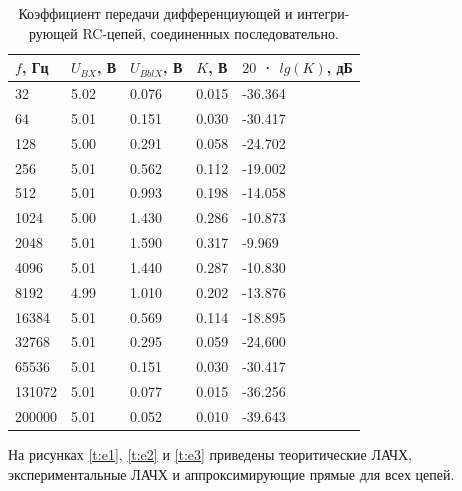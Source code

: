 \begin{table}[H]
	\begin{center}
	\caption{Коэффициент передачи дифференциующей и интегри-
рующей RC-цепей, соединенных последовательно.}
	\def\arraystretch{1.5}
		\begin{tabularx}{\textwidth}{|X|X|X|X|X|}
			\hline
			$f$, Гц & $U_{BX}$, В & $U_{BblX}$, В & $K$, В & $20$ · $lg(K)$, дБ\\\hline
			32 & 5.02 & 0.076 & 0.015 & -36.364\\\hline
			64 & 5.01 & 0.151 & 0.030 & -30.417\\\hline
			128 & 5.00 & 0.291 & 0.058 & -24.702\\\hline
			256 & 5.01 & 0.562 & 0.112 & -19.002\\\hline
			512 & 5.01 & 0.993 & 0.198 & -14.058\\\hline
			1024 & 5.00 & 1.430 & 0.286 & -10.873\\\hline
			2048 & 5.01 & 1.590 & 0.317 & -9.969\\\hline
			4096 & 5.01 & 1.440 & 0.287 & -10.830\\\hline
			8192 & 4.99 & 1.010 & 0.202 & -13.876\\\hline
			16384 & 5.01 & 0.569 & 0.114 & -18.895\\\hline
			32768 & 5.01 & 0.295 & 0.059 & -24.600\\\hline
			65536 & 5.01 & 0.151 & 0.030 & -30.417\\\hline
			131072 & 5.01 & 0.077 & 0.015 & -36.256\\\hline
			200000 & 5.01 & 0.052 & 0.010 & -39.643\\\hline		
		\end{tabularx}
		\label{tabular:3}
	\end{center}
\end{table}

На рисунках \ref{t:e1}, \ref{t:e2} и \ref{t:e3} приведены теоритические ЛАЧХ, экспериментальные ЛАЧХ и аппроксимирующие прямые для всех цепей.

